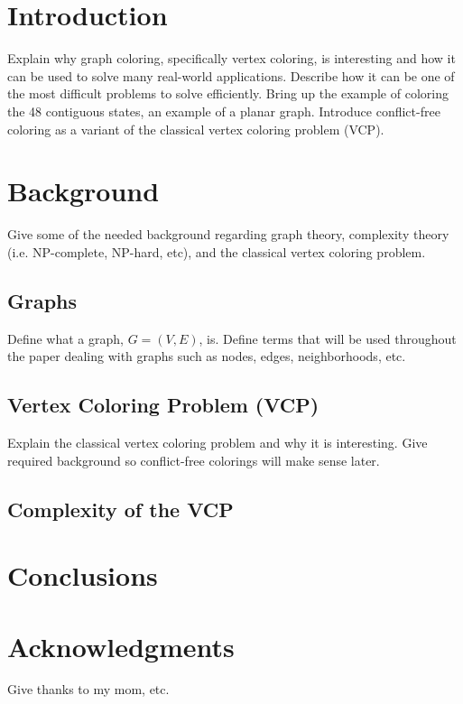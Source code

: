 \documentclass{sig-alternate}
\begin{document}
\section{Introduction}
\label{sec:introduction}
Explain why graph coloring, specifically vertex coloring, is interesting and how it can be used to solve many real-world applications. Describe how it can be one of the most difficult problems to solve efficiently. Bring up the example of coloring the 48 contiguous states, an example of a planar graph. Introduce conflict-free coloring as a variant of the classical vertex coloring problem (VCP). 

\section{Background}
\label{sec:background}
Give some of the needed background regarding graph theory, complexity theory (i.e. NP-complete, NP-hard, etc), and the classical vertex coloring problem.

\subsection{Graphs}
\label{sec:graphs}
Define what a graph, \(G = (V, E)\), is. Define terms that will be used throughout the paper dealing with graphs such as nodes, edges, neighborhoods, etc.

\subsection{Vertex Coloring Problem (VCP)}
\label{sec:vcp}
Explain the classical vertex coloring problem and why it is interesting. Give required background so conflict-free colorings will make sense later.

\subsection{Complexity of the VCP}
\label{sec:complexitytheory}

\section{Conclusions}

\section{Acknowledgments}
Give thanks to my mom, etc.


\cite{bondy1976graph}




\end{document}
